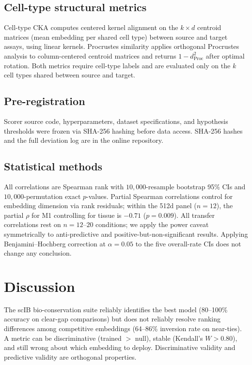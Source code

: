 \documentclass[11pt]{article}
\begin{document}
\subsection{Cell-type structural metrics}

Cell-type CKA \citep{kornblith2019similarity} computes centered kernel alignment on the $k \times d$ centroid matrices (mean embedding per shared cell type) between source and target assays, using linear kernels. Procrustes similarity applies orthogonal Procrustes analysis to column-centered centroid matrices and returns $1 - d_{\mathrm{Proc}}^2$ after optimal rotation. Both metrics require cell-type labels and are evaluated only on the $k$ cell types shared between source and target.

\subsection{Pre-registration}

Scorer source code, hyperparameters, dataset specifications, and hypothesis thresholds were frozen via SHA-256 hashing before data access. SHA-256 hashes and the full deviation log are in the online repository.

\subsection{Statistical methods}

All correlations are Spearman rank with $10{,}000$-resample bootstrap 95\% CIs and $10{,}000$-permutation exact $p$-values. Partial Spearman correlations control for embedding dimension via rank residuals; within the 512d panel ($n = 12$), the partial $\rho$ for M1 controlling for tissue is $-0.71$ ($p = 0.009$). All transfer correlations rest on $n = 12$--$20$ conditions; we apply the power caveat symmetrically to anti-predictive and positive-but-non-significant results. Applying Benjamini--Hochberg correction at $\alpha = 0.05$ to the five overall-rate CIs does not change any conclusion.


\section{Discussion}
\label{sec:discussion}

The scIB bio-conservation suite reliably identifies the best model (80--100\% accuracy on clear-gap comparisons) but does not reliably resolve ranking differences among competitive embeddings (64--86\% inversion rate on near-ties). A metric can be discriminative (trained $>$ null), stable (Kendall's $W > 0.80$), and still wrong about which embedding to deploy. Discriminative validity and predictive validity are orthogonal properties.
\end{document}
